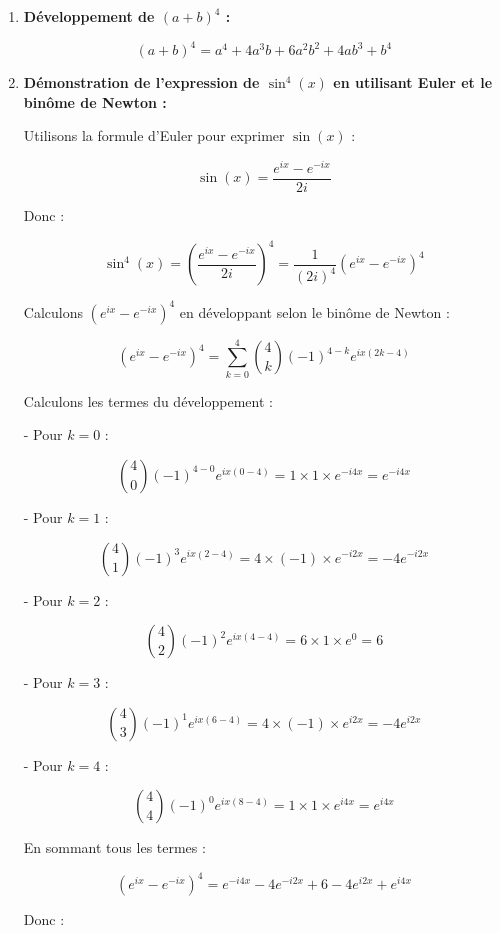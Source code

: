 \documentclass[a4paper,12pt]{article}
\begin{document}
\begin{solutionbox}
\begin{enumerate}
    \item \textbf{Développement de \( (a + b)^4 \) :}

    \[
    (a + b)^4 = a^4 + 4a^3 b + 6a^2 b^2 + 4a b^3 + b^4
    \]

    \item \textbf{Démonstration de l'expression de \( \sin^4(x) \) en utilisant Euler et le binôme de Newton :}

    Utilisons la formule d'Euler pour exprimer \( \sin(x) \) :

    \[
    \sin(x) = \dfrac{e^{i x} - e^{-i x}}{2i}
    \]

    Donc :

    \[
    \sin^4(x) = \left( \dfrac{e^{i x} - e^{-i x}}{2i} \right)^4 = \dfrac{1}{(2i)^4} \left( e^{i x} - e^{-i x} \right)^4
    \]

    Calculons \( (e^{i x} - e^{-i x})^4 \) en développant selon le binôme de Newton :

    \[
    (e^{i x} - e^{-i x})^4 = \sum_{k=0}^4 \binom{4}{k} (-1)^{4 - k} e^{i x (2k - 4)}
    \]

    Calculons les termes du développement :

    - Pour \( k = 0 \) :

    \[
    \binom{4}{0} (-1)^{4 - 0} e^{i x (0 - 4)} = 1 \times 1 \times e^{-i 4 x} = e^{-i 4 x}
    \]

    - Pour \( k = 1 \) :

    \[
    \binom{4}{1} (-1)^{3} e^{i x (2 - 4)} = 4 \times (-1) \times e^{-i 2 x} = -4 e^{-i 2 x}
    \]

    - Pour \( k = 2 \) :

    \[
    \binom{4}{2} (-1)^{2} e^{i x (4 - 4)} = 6 \times 1 \times e^{0} = 6
    \]

    - Pour \( k = 3 \) :

    \[
    \binom{4}{3} (-1)^{1} e^{i x (6 - 4)} = 4 \times (-1) \times e^{i 2 x} = -4 e^{i 2 x}
    \]

    - Pour \( k = 4 \) :

    \[
    \binom{4}{4} (-1)^{0} e^{i x (8 - 4)} = 1 \times 1 \times e^{i 4 x} = e^{i 4 x}
    \]

    En sommant tous les termes :

    \[
    (e^{i x} - e^{-i x})^4 = e^{-i 4 x} - 4 e^{-i 2 x} + 6 - 4 e^{i 2 x} + e^{i 4 x}
    \]

    Donc :


\end{enumerate}
\end{solutionbox}
\end{document}
